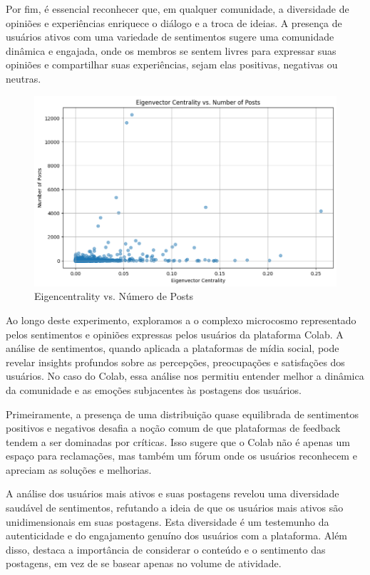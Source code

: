 Por fim, é essencial reconhecer que, em qualquer comunidade, a diversidade de opiniões e experiências enriquece o diálogo e a troca de ideias. A presença de usuários ativos com uma variedade de sentimentos sugere uma comunidade dinâmica e engajada, onde os membros se sentem livres para expressar suas opiniões e compartilhar suas experiências, sejam elas positivas, negativas ou neutras.

\begin{figure}[!htb]
	\caption{Eigencentrality vs. Número de Posts}
	\label{fig:eigencentrality_vs_number_of_posts}
	\centering
	\includegraphics[scale=0.70]{images/eigencentrality_vs_number_of_posts.png}
	\fautor
\end{figure}

Ao longo deste experimento, exploramos a o complexo microcosmo representado pelos sentimentos e opiniões expressas pelos usuários da plataforma Colab. A análise de sentimentos, quando aplicada a plataformas de mídia social, pode revelar insights profundos sobre as percepções, preocupações e satisfações dos usuários. No caso do Colab, essa análise nos permitiu entender melhor a dinâmica da comunidade e as emoções subjacentes às postagens dos usuários.

Primeiramente, a presença de uma distribuição quase equilibrada de sentimentos positivos e negativos desafia a noção comum de que plataformas de feedback tendem a ser dominadas por críticas. Isso sugere que o Colab não é apenas um espaço para reclamações, mas também um fórum onde os usuários reconhecem e apreciam as soluções e melhorias.

A análise dos usuários mais ativos e suas postagens revelou uma diversidade saudável de sentimentos, refutando a ideia de que os usuários mais ativos são unidimensionais em suas postagens. Esta diversidade é um testemunho da autenticidade e do engajamento genuíno dos usuários com a plataforma. Além disso, destaca a importância de considerar o conteúdo e o sentimento das postagens, em vez de se basear apenas no volume de atividade.

